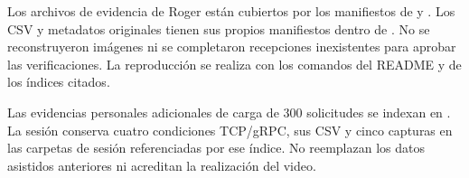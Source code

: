 Los archivos de evidencia de Roger están cubiertos por los manifiestos de
 y
. Los CSV y metadatos originales tienen
sus propios manifiestos dentro de . No se reconstruyeron imágenes
ni se completaron recepciones inexistentes para aprobar las verificaciones.
La reproducción se realiza con los comandos del README y de los índices citados.


Las evidencias personales adicionales de carga de 300 solicitudes se indexan
en . La sesión
 conserva cuatro condiciones TCP/gRPC,
sus CSV y cinco capturas en las carpetas de sesión referenciadas por ese índice.
No reemplazan los datos asistidos anteriores ni acreditan la realización del video.
